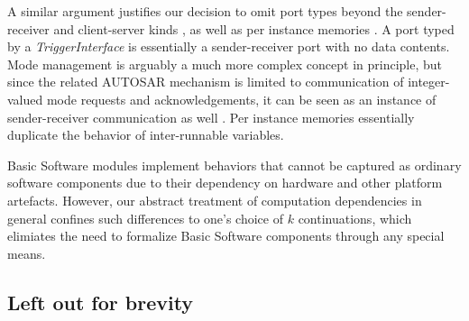 \documentclass[10pt,conference]{IEEEtran}
\begin{document}
A similar argument justifies our decision to omit port types beyond the sender-receiver and client-server kinds \cite[ch.~4.2]{AR:SWC}, as well as per instance memories \cite[ch.~7.7]{AR:SWC}. A port typed by a \emph{TriggerInterface} \cite[ch.~4.4.7]{AR:SWC} is essentially a sender-receiver port with no data contents. Mode management is arguably a much more complex concept in principle, but since the related AUTOSAR mechanism is limited to communication of integer-valued mode requests and acknowledgements, it can be seen as an instance of sender-receiver communication as well \cite[ch.~4.4.6]{AR:SWC}. Per instance memories essentially duplicate the behavior of inter-runnable variables.

Basic Software modules implement behaviors that cannot be captured as ordinary software components due to their dependency on hardware and other platform artefacts. However, our abstract treatment of computation dependencies in general confines such differences to one's choice of $k$ continuations, which elimiates the need to formalize Basic Software components through any special means.


\subsection{Left out for brevity}
\end{document}
